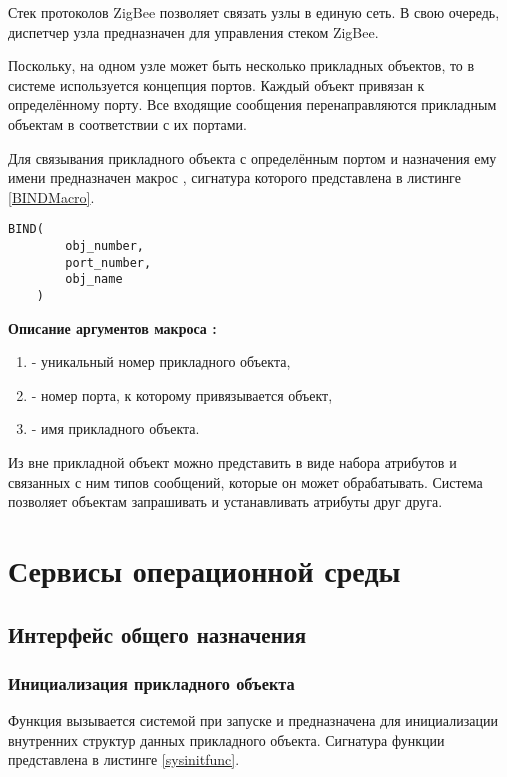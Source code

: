 Стек протоколов ZigBee позволяет связать узлы в единую сеть. В свою очередь, диспетчер узла предназначен
для управления стеком ZigBee. 

Поскольку, на одном узле может быть несколько прикладных объектов, то в системе \zigzag используется
концепция портов. Каждый объект привязан к определённому порту. Все входящие сообщения перенаправляются
прикладным объектам в соответствии с их портами. 

Для связывания прикладного объекта с определённым портом и назначения ему имени предназначен макрос , 
сигнатура которого представлена в листинге \ref{BINDMacro}.

\begin{lstlisting}[caption=Сигнатура макроса BIND, label=BINDMacro]
    BIND(
        obj_number,
        port_number,
        obj_name
    )
\end{lstlisting}

{\bfseries Описание аргументов макроса :}

{\itshape
\begin{enumerate}
\item {} - уникальный номер прикладного объекта,
\item {} - номер порта, к которому привязывается объект,
\item {} - имя прикладного объекта. 
\end{enumerate}
}

Из вне прикладной объект можно представить в виде набора атрибутов и связанных с ним типов сообщений, которые
он может обрабатывать. Система \zigzag позволяет объектам запрашивать и устанавливать атрибуты друг друга.

\section{Сервисы операционной среды}

\subsection{Интерфейс общего назначения}

\subsubsection{Инициализация прикладного объекта}

Функция  вызывается системой \zigzag при запуске и предназначена
для инициализации внутренних структур данных прикладного объекта. Сигнатура функции
представлена в листинге \ref{sysinitfunc}.

